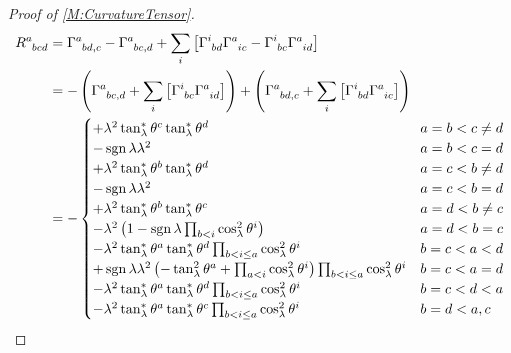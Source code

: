 \documentclass[../methodology.tex]{subfiles}
\begin{document}
\begin{proof}[Proof of \cref{M:CurvatureTensor}]
\begin{align*}
    \tensor{R}{^a_b_c_d}
     & =
    \tensor{\Gamma}{^a_b_d_{,c}}
    -\tensor{\Gamma}{^a_b_c_{,d}}
    +\sum_{i}\left[\tensor{\Gamma}{^i_b_d}\tensor{\Gamma}{^a_i_c}-\tensor{\Gamma}{^i_b_c}\tensor{\Gamma}{^a_i_d}\right]
    \\
     & =
    -\left(
    \tensor{\Gamma}{^a_b_c_{,d}}
    +\sum_{i}\left[\tensor{\Gamma}{^i_b_c}\tensor{\Gamma}{^a_i_d}\right]
    \right)
    +\left(
    \tensor{\Gamma}{^a_b_d_{,c}}
    +\sum_{i}\left[\tensor{\Gamma}{^i_b_d}\tensor{\Gamma}{^a_i_c}\right]
    \right)                                                                                                                                                                                 \\
     & =-
    \begin{cases}
      +\lambda^2\tan_\lambda^\ast\tensor{\theta}{^c}\tan_\lambda^\ast\tensor{\theta}{^d}
        & \text{\(a=b<c\ne d\)} \\
      -\sign{\lambda}\lambda^2
        & \text{\(a=b<c=d\)}    \\
      +\lambda^2\tan_\lambda^\ast\tensor{\theta}{^b}\tan_\lambda^\ast\tensor{\theta}{^d}
        & \text{\(a=c<b\ne d\)} \\
      -\sign{\lambda}\lambda^2
        & \text{\(a=c<b=d\)}    \\
      +\lambda^2\tan_\lambda^\ast\tensor{\theta}{^b}\tan_\lambda^\ast\tensor{\theta}{^c}
        & \text{\(a=d<b\ne c\)} \\
      -\lambda^2
      \left(
      1
      -\sign{\lambda}\prod_{b<i}\cos_\lambda^2\tensor{\theta}{^i}
      \right)
        & \text{\(a=d<b=c\)}    \\
      -\lambda^2\tan_\lambda^\ast\tensor{\theta}{^a}\tan_\lambda^\ast\tensor{\theta}{^d}\prod_{b<i\le a}\cos_\lambda^2\tensor{\theta}{^i}
        & \text{\(b=c<a<d\)}    \\
      +\sign{\lambda}\lambda^2
      \left(
      -\tan_\lambda^2\tensor{\theta}{^a}
      +\prod_{a<i}\cos_\lambda^2\tensor{\theta}{^i}
      \right)
      \prod_{b<i\le a}\cos_\lambda^2\tensor{\theta}{^i}
        & \text{\(b=c<a=d\)}    \\
      -\lambda^2\tan_\lambda^\ast\tensor{\theta}{^a}\tan_\lambda^\ast\tensor{\theta}{^d}\prod_{b<i\le a}{\cos_\lambda^2\tensor{\theta}{^i}}
        & \text{\(b=c<d<a\)}    \\
      -\lambda^2\tan_\lambda^\ast\tensor{\theta}{^a}\tan_\lambda^\ast\tensor{\theta}{^c}\prod_{b<i\le a}\cos_\lambda^2\tensor{\theta}{^i}
        & \text{\(b=d<a,c\)}    \\

\end{cases}
\end{align*}
\end{proof}
\end{document}
